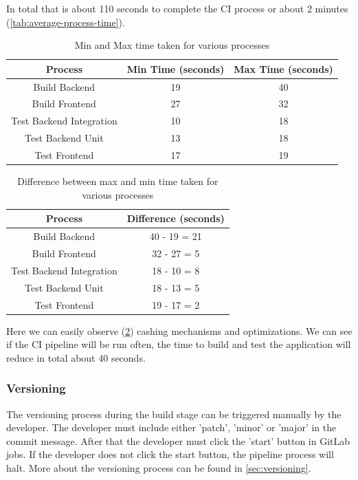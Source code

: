 \documentclass[]{VUMIFTemplateClass}
\begin{document}
In total that is about 110 seconds to complete the CI process or about 2 minutes (\ref{tab:average-process-time}).

\begin{table}[H]
    \centering
    \begin{tabular}{|c|c|c|}
        \hline
        \textbf{Process} & \textbf{Min Time (seconds)} & \textbf{Max Time (seconds)} \\
        \hline
        Build Backend & 19 & 40 \\
        \hline
        Build Frontend & 27 & 32 \\
        \hline
        Test Backend Integration & 10 & 18 \\
        \hline
        Test Backend Unit & 13 & 18 \\
        \hline
        Test Frontend & 17 & 19 \\
        \hline
    \end{tabular}
    \caption{Min and Max time taken for various processes}
    \label{tab:min-max-process-time}
\end{table}

\begin{table}[H]
    \centering
    \begin{tabular}{|c|c|}
        \hline
        \textbf{Process} & \textbf{Difference (seconds)} \\
        \hline
        Build Backend & 40 - 19 = 21 \\
        \hline
        Build Frontend & 32 - 27 = 5 \\
        \hline
        Test Backend Integration & 18 - 10 = 8 \\
        \hline
        Test Backend Unit & 18 - 13 = 5 \\
        \hline
        Test Frontend & 19 - 17 = 2 \\
        \hline
    \end{tabular}
    \caption{Difference between max and min time taken for various processes}
    \label{tab:diff-process-time}
\end{table}

Here we can easily observe (\ref{tab:diff-process-time}) cashing mechanisms and optimizations. We can see if the CI pipeline will be run often, the time 
to build and test the application will reduce in total about 40 seconds.

\subsubsection{Versioning}
The versioning process during the build stage can be triggered manually by the developer. The developer must include either 'patch', 'minor' or 'major' in the commit message. After that the developer must click the 'start' button in GitLab jobs. If the developer does not click the start button, the pipeline process will halt.
More about the versioning process can be found in \ref{sec:versioning}.
\end{document}
